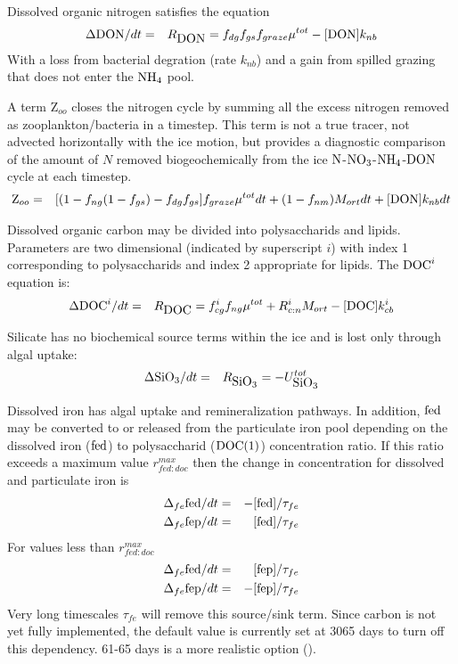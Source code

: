 Dissolved organic nitrogen satisfies the equation
\begin{eqnarray}
\Delta \mbox{DON}/dt & = & R_{\mbox{DON}} = f_{dg}f_{gs}f_{graze}\mu^{tot} - [\mbox{DON}]k_{nb}
\end{eqnarray}
With a loss from bacterial degration (rate $k_{nb}$) and a gain from
spilled grazing that does not enter the $\mbox{NH$_4$}$ pool.

A term Z$_{oo}$ closes the nitrogen cycle by summing all the excess nitrogen removed as zooplankton/bacteria in a timestep.  This term
is not a true tracer, \bgcie  not advected horizontally with the ice motion,
but provides a diagnostic comparison of the amount of $N$ removed
biogeochemically from the ice $\mbox{N}$-$\mbox{NO$_3$}$-$\mbox{NH$_4$}$-$\mbox{DON}$ cycle at each
timestep.
\begin{eqnarray}
\mbox{Z}_{oo} & = & [(1-f_{ng}(1-f_{gs}) - f_{dg}f_{gs}]f_{graze}\mu^{tot}dt + (1-f_{nm})M_{ort}dt  +
[\mbox{DON}]k_{nb}dt \nonumber
\end{eqnarray}

Dissolved organic carbon may be divided into polysaccharids and
lipids.  Parameters are two dimensional (indicated by superscript $i$)
with index 1 corresponding to
polysaccharids and index 2 appropriate for lipids.  The $\mbox{DOC}^i$
equation is:
\begin{eqnarray}
\Delta \mbox{DOC}^i/dt & = & R_{\mbox{DOC}} = f^i_{cg}f_{ng}\mu^{tot} + R^i_{c:n}M_{ort}-[\mbox{DOC}]k^i_{cb}
\end{eqnarray}

Silicate has no biochemical source terms within the ice and is lost
only through algal uptake:
\begin{eqnarray}
\Delta \mbox{SiO$_3$}/dt & = & R_{\mbox{SiO$_3$}} = -U_{\mbox{SiO$_3$}}^{tot}
\end{eqnarray}

Dissolved iron has algal uptake and  remineralization pathways. In
addition, $\mbox{fed}$ may be converted to or released from the particulate
iron pool depending on the dissolved iron ($\mbox{fed}$) to polysaccharid ($\mbox{DOC}(1)$)
concentration ratio.  If this ratio exceeds a maximum value
$r^{max}_{fed:doc}$ then the change in concentration for dissolved and
particulate iron is
\begin{eqnarray}
\Delta_{fe}\mbox{fed}/dt & = & -[\mbox{fed}]/\tau_{fe} \nonumber \\
\Delta_{fe}\mbox{fep}/dt & = & [\mbox{fed}]/\tau_{fe}
\end{eqnarray}
For values less than $r^{max}_{fed:doc}$
\begin{eqnarray}
\Delta_{fe}\mbox{fed}/dt & = & [\mbox{fep}]/\tau_{fe} \nonumber \\
\Delta_{fe}\mbox{fep}/dt & = & -[\mbox{fep}]/\tau_{fe}
\end{eqnarray}
Very long timescales $\tau_{fe}$ will remove this source/sink
term. Since carbon is not yet fully implemented, the default value is currently set at 3065 days to turn off this
dependency. 61-65 days is a more realistic option (\cite{Parekh:iron:2004}).

